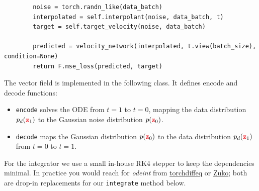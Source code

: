 \documentclass[usenames,dvipsnames]{article}
\newcommand{\myvec}[1]{\mathbf{#1}}
\newcommand{\vz}{\myvec{\textcolor{Red}{z}}}
\begin{document}
\begin{verbatim}
        noise = torch.randn_like(data_batch)
        interpolated = self.interpolant(noise, data_batch, t)
        target = self.target_velocity(noise, data_batch)

        predicted = velocity_network(interpolated, t.view(batch_size), condition=None)
        return F.mse_loss(predicted, target)
\end{verbatim}


The vector field is implemented in the following class. It defines encode and decode functions:
\begin{itemize}
\item \texttt{encode} solves the ODE from $t=1$ to $t=0$, mapping the data distribution $p_d(\vz_1)$ to the Gaussian noise distribution $p(\vz_0)$.
\item \texttt{decode} maps the Gaussian distribution $p(\vz_0)$ to the data distribution $p_d(\vz_1)$ from $t=0$ to $t=1$.
\end{itemize}
For the integrator we use a small in-house RK4 stepper to keep the dependencies minimal. In practice you would reach for \emph{odeint} from \href{https://github.com/rtqichen/torchdiffeq}{torchdiffeq} or \href{https://github.com/probabilists/zuko}{Zuko}; both are drop-in replacements for our \texttt{integrate} method below.
\end{document}
